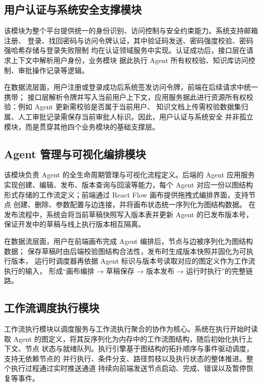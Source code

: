 \subsection{用户认证与系统安全支撑模块}

该模块为整个平台提供统一的身份识别、访问控制与安全约束能力。系统支持邮箱注册、
登录、找回密码与访问令牌认证，其中验证码发送、密码强度校验、密码强哈希存储与登录失败限制
均在认证领域服务中实现。认证成功后，接口层在请求上下文中解析用户身份，业务模块
据此执行 Agent 所有权校验、知识库访问控制、审批操作记录等逻辑。

在数据流层面，用户注册或登录成功后系统签发访问令牌，前端在后续请求中统一携带；
接口层解析令牌并写入当前用户上下文，应用服务据此进行资源所有权校验：例如 Agent 更新需校验是否属于当前用户、
知识文档上传需校验数据集归属、人工审批记录需保存当前审批人标识。因此，用户认证与系统安全
并非孤立模块，而是贯穿其他四个业务模块的基础支撑层。

\subsection{Agent 管理与可视化编排模块}

该模块负责 Agent 的全生命周期管理与可视化流程定义。后端的 Agent 应用服务
实现创建、编辑、发布、版本查询与回滚等能力，每个 Agent 对应一份以图结构
形式存储的工作流定义；前端通过 React Flow 画布提供拖拽式编排界面，支持节点
创建、删除、参数配置与边连接，并将画布状态统一序列化为图结构数据。
在发布流程中，系统会将当前草稿快照写入版本表并更新 Agent 的已发布版本号，
保证开发中的草稿与线上执行版本相互隔离。

在数据流层面，用户在前端画布完成 Agent 编排后，节点与边被序列化为图结构数据；
保存草稿时由后端校验图结构合法性，发布时生成版本快照并固化为可执行版本，
运行时调度器再依据 Agent 标识与版本号读取对应的图定义作为工作流执行的输入，
形成“画布编排 → 草稿保存 → 版本发布 → 运行时执行”的完整链路。

\subsection{工作流调度执行模块}

工作流执行模块以调度服务与工作流执行聚合的协作为核心。系统在执行开始时读取
Agent 的图定义，将其反序列化为内存中的工作流图结构，随后初始化执行上下文、节点
状态与就绪队列。执行引擎基于图结构的拓扑顺序与事件驱动调度，支持无依赖节点的
并行执行、条件分支、路径剪枝以及执行状态的整体推进。整个执行过程通过实时推送通道
持续向前端发送节点启动、完成、错误以及暂停恢复等事件。

